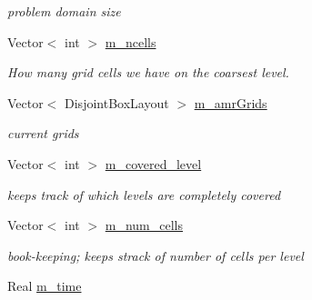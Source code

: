 \begin{DoxyCompactItemize}
\begin{DoxyCompactList}\small\item\em problem domain size \end{DoxyCompactList}\item 
\hypertarget{classamr_mushy_layer_a8181443b430846f1329568648bd38643}{Vector$<$ int $>$ \hyperlink{classamr_mushy_layer_a8181443b430846f1329568648bd38643}{m\-\_\-ncells}}\label{classamr_mushy_layer_a8181443b430846f1329568648bd38643}

\begin{DoxyCompactList}\small\item\em How many grid cells we have on the coarsest level. \end{DoxyCompactList}\item 
\hypertarget{classamr_mushy_layer_aea54f4c044f996ed325b3ed9e724f635}{Vector$<$ Disjoint\-Box\-Layout $>$ \hyperlink{classamr_mushy_layer_aea54f4c044f996ed325b3ed9e724f635}{m\-\_\-amr\-Grids}}\label{classamr_mushy_layer_aea54f4c044f996ed325b3ed9e724f635}

\begin{DoxyCompactList}\small\item\em current grids \end{DoxyCompactList}\item 
\hypertarget{classamr_mushy_layer_a062279762cc34b3cfb985624bc540102}{Vector$<$ int $>$ \hyperlink{classamr_mushy_layer_a062279762cc34b3cfb985624bc540102}{m\-\_\-covered\-\_\-level}}\label{classamr_mushy_layer_a062279762cc34b3cfb985624bc540102}

\begin{DoxyCompactList}\small\item\em keeps track of which levels are completely covered \end{DoxyCompactList}\item 
\hypertarget{classamr_mushy_layer_a604e2cc3dab5b3d20485ee043f85e108}{Vector$<$ int $>$ \hyperlink{classamr_mushy_layer_a604e2cc3dab5b3d20485ee043f85e108}{m\-\_\-num\-\_\-cells}}\label{classamr_mushy_layer_a604e2cc3dab5b3d20485ee043f85e108}

\begin{DoxyCompactList}\small\item\em book-\/keeping; keeps strack of number of cells per level \end{DoxyCompactList}\item 
\hypertarget{classamr_mushy_layer_a199fa466c7f07be2360dc16e48f85cd1}{Real \hyperlink{classamr_mushy_layer_a199fa466c7f07be2360dc16e48f85cd1}{m\-\_\-time}}\label{classamr_mushy_layer_a199fa466c7f07be2360dc16e48f85cd1}


\end{DoxyCompactItemize}
